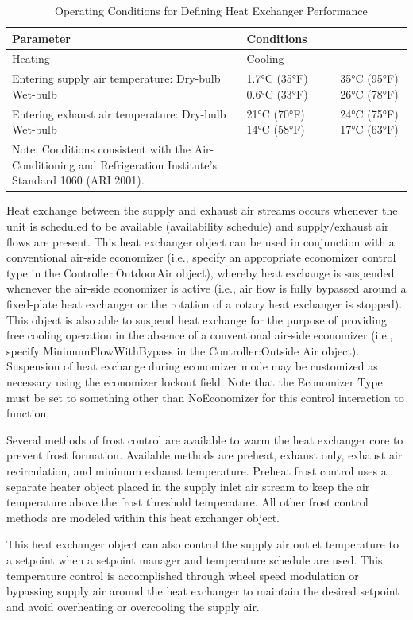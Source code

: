 \begin{longtable}[c]{p{3.0in}p{1.5in}p{1.5in}}
\caption{  Operating Conditions for Defining Heat Exchanger Performance \protect \label{table:operating-conditions-for-defining-heat}}\\
\toprule 
Parameter & Conditions \tabularnewline \midrule
\endhead
Heating & Cooling \tabularnewline
Entering supply air temperature:  Dry-bulb  Wet-bulb & 1.7°C (35°F)  0.6°C (33°F) & 35°C (95°F)  26°C (78°F) \tabularnewline
Entering exhaust air temperature:  Dry-bulb  Wet-bulb & 21°C (70°F)  14°C (58°F) & 24°C (75°F)  17°C (63°F) \tabularnewline
Note: Conditions consistent with the Air-Conditioning and Refrigeration Institute’s Standard 1060 (ARI 2001). \tabularnewline
\bottomrule
\end{longtable}

Heat exchange between the supply and exhaust air streams occurs whenever the unit is scheduled to be available (availability schedule) and supply/exhaust air flows are present. This heat exchanger object can be used in conjunction with a conventional air-side economizer (i.e., specify an appropriate economizer control type in the Controller:OutdoorAir object), whereby heat exchange is suspended whenever the air-side economizer is active (i.e., air flow is fully bypassed around a fixed-plate heat exchanger or the rotation of a rotary heat exchanger is stopped). This object is also able to suspend heat exchange for the purpose of providing free cooling operation in the absence of a conventional air-side economizer (i.e., specify MinimumFlowWithBypass in the Controller:Outside Air object). Suspension of heat exchange during economizer mode may be customized as necessary using the economizer lockout field. Note that the Economizer Type must be set to something other than NoEconomizer for this control interaction to function.

Several methods of frost control are available to warm the heat exchanger core to prevent frost formation. Available methods are preheat, exhaust only, exhaust air recirculation, and minimum exhaust temperature. Preheat frost control uses a separate heater object placed in the supply inlet air stream to keep the air temperature above the frost threshold temperature. All other frost control methods are modeled within this heat exchanger object.

This heat exchanger object can also control the supply air outlet temperature to a setpoint when a setpoint manager and temperature schedule are used. This temperature control is accomplished through wheel speed modulation or bypassing supply air around the heat exchanger to maintain the desired setpoint and avoid overheating or overcooling the supply air.

